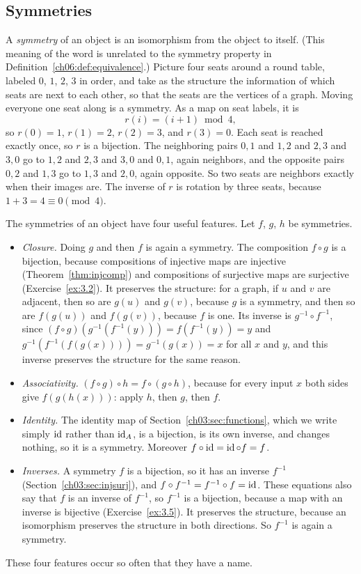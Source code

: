 \subsection*{Symmetries}
A \emph{symmetry} of an object is an isomorphism from the object to itself. (This meaning of the word is unrelated to the symmetry property in Definition~\ref{ch06:def:equivalence}.) Picture four seats around a round table, labeled $0$, $1$, $2$, $3$ in order, and take as the structure the information of which seats are next to each other, so that the seats are the vertices of a graph. Moving everyone one seat along is a symmetry. As a map on seat labels, it is
\[
r(i)=(i+1)\bmod4,
\]
so $r(0)=1$, $r(1)=2$, $r(2)=3$, and $r(3)=0$. Each seat is reached exactly once, so $r$ is a bijection. The neighboring pairs $0,1$ and $1,2$ and $2,3$ and $3,0$ go to $1,2$ and $2,3$ and $3,0$ and $0,1$, again neighbors, and the opposite pairs $0,2$ and $1,3$ go to $1,3$ and $2,0$, again opposite. So two seats are neighbors exactly when their images are. The inverse of $r$ is rotation by three seats, because $1+3=4\equiv0\pmod4$.

The symmetries of an object have four useful features. Let $f$, $g$, $h$ be symmetries.
\begin{itemize}
\item \emph{Closure.} Doing $g$ and then $f$ is again a symmetry. The composition $f\circ g$ is a bijection, because compositions of injective maps are injective (Theorem~\ref{thm:injcomp}) and compositions of surjective maps are surjective (Exercise~\ref{ex:3.2}). It preserves the structure: for a graph, if $u$ and $v$ are adjacent, then so are $g(u)$ and $g(v)$, because $g$ is a symmetry, and then so are $f(g(u))$ and $f(g(v))$, because $f$ is one. Its inverse is $g^{-1}\circ f^{-1}$, since $(f\circ g)(g^{-1}(f^{-1}(y)))=f(f^{-1}(y))=y$ and $g^{-1}(f^{-1}(f(g(x))))=g^{-1}(g(x))=x$ for all $x$ and $y$, and this inverse preserves the structure for the same reason.
\item \emph{Associativity.} $(f\circ g)\circ h=f\circ(g\circ h)$, because for every input $x$ both sides give $f(g(h(x)))$: apply $h$, then $g$, then $f$.
\item \emph{Identity.} The identity map of Section~\ref{ch03:sec:functions}, which we write simply $\operatorname{id}$ rather than $\operatorname{id}_A$, is a bijection, is its own inverse, and changes nothing, so it is a symmetry. Moreover $f\circ\operatorname{id}=\operatorname{id}\circ f=f$.
\item \emph{Inverses.} A symmetry $f$ is a bijection, so it has an inverse $f^{-1}$ (Section~\ref{ch03:sec:injsurj}), and $f\circ f^{-1}=f^{-1}\circ f=\operatorname{id}$. These equations also say that $f$ is an inverse of $f^{-1}$, so $f^{-1}$ is a bijection, because a map with an inverse is bijective (Exercise~\ref{ex:3.5}). It preserves the structure, because an isomorphism preserves the structure in both directions. So $f^{-1}$ is again a symmetry.
\end{itemize}
These four features occur so often that they have a name.

